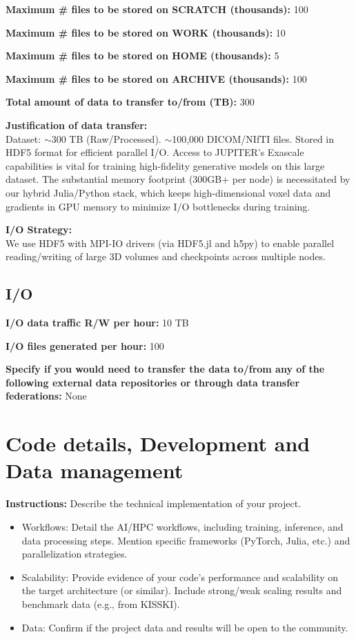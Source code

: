 \documentclass[12pt,a4paper]{article}
\begin{document}
\textbf{Maximum \# files to be stored on SCRATCH (thousands):} 100

\textbf{Maximum \# files to be stored on WORK (thousands):} 10

\textbf{Maximum \# files to be stored on HOME (thousands):} 5

\textbf{Maximum \# files to be stored on ARCHIVE (thousands):} 100

\textbf{Total amount of data to transfer to/from (TB):} 300

\textbf{Justification of data transfer:} \\
Dataset: $\sim$300 TB (Raw/Processed). $\sim$100,000 DICOM/NIfTI files. Stored in HDF5 format for efficient parallel I/O. Access to JUPITER's Exascale capabilities is vital for training high-fidelity generative models on this large dataset. The substantial memory footprint (300GB+ per node) is necessitated by our hybrid Julia/Python stack, which keeps high-dimensional voxel data and gradients in GPU memory to minimize I/O bottlenecks during training.

\textbf{I/O Strategy:} \\
We use HDF5 with MPI-IO drivers (via HDF5.jl and h5py) to enable parallel reading/writing of large 3D volumes and checkpoints across multiple nodes.

\subsection*{I/O}

\textbf{I/O data traffic R/W per hour:} 10 TB

\textbf{I/O files generated per hour:} 100

\textbf{Specify if you would need to transfer the data to/from any of the following external data repositories or through data transfer federations:} None

\section*{Code details, Development and Data management}

\textbf{Instructions:} Describe the technical implementation of your project.
\begin{itemize}
    \item Workflows: Detail the AI/HPC workflows, including training, inference, and data processing steps. Mention specific frameworks (PyTorch, Julia, etc.) and parallelization strategies.
    \item Scalability: Provide evidence of your code's performance and scalability on the target architecture (or similar). Include strong/weak scaling results and benchmark data (e.g., from KISSKI).
    \item Data: Confirm if the project data and results will be open to the community.
\end{itemize}
\end{document}
